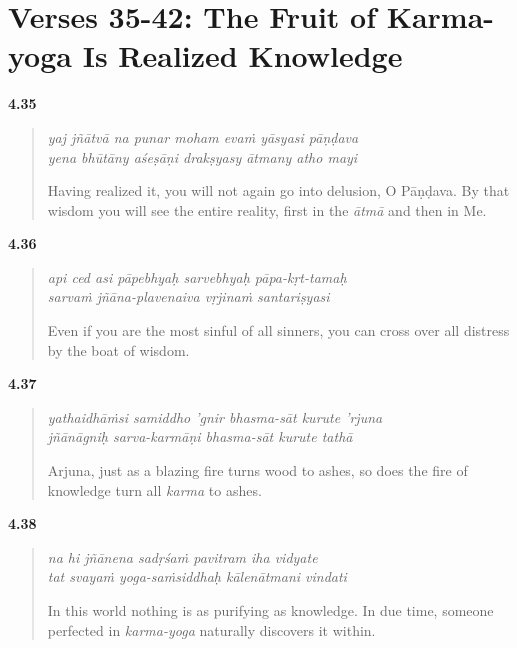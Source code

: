 \section{Verses 35-42: The Fruit of Karma-yoga Is Realized Knowledge}\label{sec-verses-35-42-the-fruit-of-karma-yoga-is-realized-knowledge}

\par\noindent\textbf{4.35}\par
\begin{verse}
\textit{yaj jñātvā na punar moham evaṁ yāsyasi pāṇḍava} \\
\textit{yena bhūtāny aśeṣāṇi drakṣyasy ātmany atho mayi}

\noindent Having realized it, you will not again go into delusion, O Pāṇḍava. By that wisdom you will see the entire reality, first in the \textit{ātmā} and then in Me.
\end{verse}
\par



\par\noindent\textbf{4.36}\par
\begin{verse}
\textit{api ced asi pāpebhyaḥ sarvebhyaḥ pāpa-kṛt-tamaḥ} \\
\textit{sarvaṁ jñāna-plavenaiva vṛjinaṁ santariṣyasi}

\noindent Even if you are the most sinful of all sinners, you can cross over all distress by the boat of wisdom.
\end{verse}
\par



\par\noindent\textbf{4.37}\par
\begin{verse}
\textit{yathaidhāṁsi samiddho ’gnir bhasma-sāt kurute ’rjuna} \\
\textit{jñānāgniḥ sarva-karmāṇi bhasma-sāt kurute tathā}

\noindent Arjuna, just as a blazing fire turns wood to ashes, so does the fire of knowledge turn all \textit{karma} to ashes.
\end{verse}
\par



\par\noindent\textbf{4.38}\par
\begin{verse}
\textit{na hi jñānena sadṛśaṁ pavitram iha vidyate} \\
\textit{tat svayaṁ yoga-saṁsiddhaḥ kālenātmani vindati}

\noindent In this world nothing is as purifying as knowledge. In due time, someone perfected in \textit{karma-yoga} naturally discovers it within.
\end{verse}
\par



